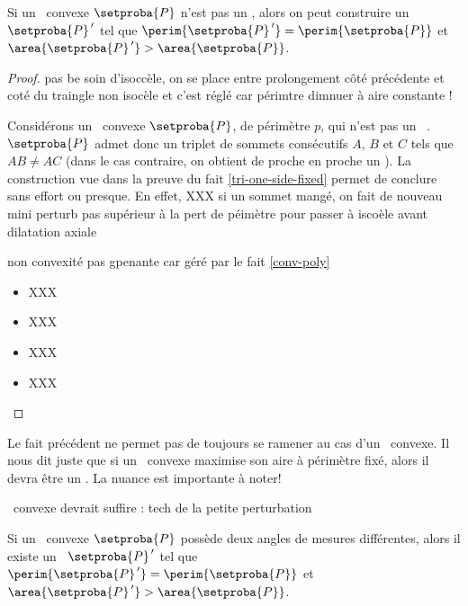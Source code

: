 

\begin{fact} \label{iso-poly} 
	Si un \ngone\ convexe $\setproba{P}$ n'est pas un \niso, alors on peut construire un \ngone\ $\setproba{P}^{\,\prime}$ tel que 
	$\perim{\setproba{P}^{\,\prime}} = \perim{\setproba{P}}$ 
	et 
	$\area{\setproba{P}^{\,\prime}} > \area{\setproba{P}}$.
\end{fact}


\begin{proof}
	pas be soin d'isoccèle, on se place entre prolongement côté précédente et coté du traingle non isocèle et c'est réglé car périmtre dimnuer à aire constante !
	
	
	Considérons un \ngone\ convexe $\setproba{P}$, de périmètre $p$, qui n'est pas un \niso\ . 
	$\setproba{P}$ admet donc un triplet de sommets consécutifs $A$, $B$ et $C$ tels que $AB \neq AC$ (dans le cas contraire, on obtient de proche en proche un \niso).
	La construction vue dans la preuve du fait \ref{tri-one-side-fixed} permet de conclure sans effort ou presque.
	En effet,
	XXX
	si un sommet mangé, on fait de nouveau mini perturb pas supérieur à la pert de péimètre pour passer à iscoèle avant dilatation axiale
	
	non convexité pas gpenante car géré par le fait \ref{conv-poly}
	\begin{itemize}
		\item XXX

		\item XXX

		\item XXX

		\item XXX
	\end{itemize}
\end{proof}


\begin{remark}
	Le fait précédent ne permet pas de toujours se ramener au cas d'un \niso\ convexe. Il nous dit juste que si un \ngone\ convexe maximise son aire à périmètre fixé, alors il devra être un \niso. La nuance est importante à noter!
\end{remark}




\begin{fact} \label{almost-reg-poly}
	\ngone\ convexe  devrait suffire : tech de la petite perturbation
	
	Si un \niso\  convexe $\setproba{P}$ possède deux angles de mesures différentes,
	alors il existe un \ngone\ $\setproba{P}^{\,\prime}$ tel que
	$\perim{\setproba{P}^{\,\prime}} = \perim{\setproba{P}}$ 
	et 
	$\area{\setproba{P}^{\,\prime}} > \area{\setproba{P}}$.
\end{fact}


